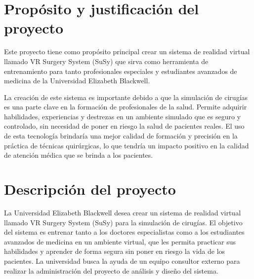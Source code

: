   \pagestyle{empty}
  
  \portada

  \newpage

  \pagestyle{empty}

  \sectionfont{\color{darkblue}\normalfont\Large\bfseries}
  
  \tableofcontents

  \newpage

  \pagestyle{main}

  \sectionfont{\color{darkblue}\normalfont\Large\bfseries}
  \subsectionfont{\color{lightblue}\normalfont\large\bfseries}
  \subsubsectionfont{\color{lightred}\normalfont\large\itshape}

  
  \section{Propósito y justificación del proyecto}
  Este proyecto tiene como propósito principal crear un sistema de realidad virtual llamado VR Surgery System (SuSy) que sirva como herramienta
  de entrenamiento para tanto profesionales especiales y estudiantes avanzados
  de medicina de la Universidad Elizabeth Blackwell.

  La creación de este sistema es importante debido a que la simulación de 
  cirugías es una parte clave en la formación de profesionales de la salud.
  Permite adquirir habilidades, experiencias y destrezas en un ambiente simulado que es seguro y controlado, sin necesidad de poner en riesgo la 
  salud de pacientes reales. El uso de esta tecnología brindaría una mejor
  calidad de formación y precisión en la práctica de técnicas quirúrgicas, lo
  que tendría un impacto positivo en la calidad de atención médica que se
  brinda a los pacientes.

  \section{Descripción del proyecto}
  La Universidad Elizabeth Blackwell desea crear un sistema de realidad virtual llamado VR Surgery System (SuSy) para la simulación de cirugías. El objetivo del sistema es entrenar tanto a los doctores especialistas como a los estudiantes avanzados de medicina en un ambiente virtual, que les permita practicar sus habilidades y aprender de forma segura sin poner en riesgo la vida de los pacientes. La universidad busca la ayuda de un equipo consultor externo para realizar la administración del proyecto de análisis y diseño del sistema.
